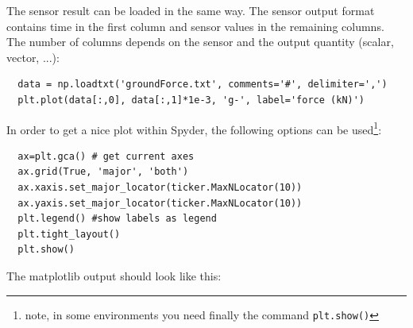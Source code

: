 The sensor result can be loaded in the same way. The sensor output format contains time in the first column and sensor values in the remaining columns. The number of columns depends on the 
sensor and the output quantity (scalar, vector, ...):
\pythonstyle\begin{lstlisting}
  data = np.loadtxt('groundForce.txt', comments='#', delimiter=',')
  plt.plot(data[:,0], data[:,1]*1e-3, 'g-', label='force (kN)')
\end{lstlisting}
%
In order to get a nice plot within Spyder, the following options can be used\footnote{note, in some environments you need finally the command \texttt{plt.show()}}:
\pythonstyle\begin{lstlisting}
  ax=plt.gca() # get current axes
  ax.grid(True, 'major', 'both')
  ax.xaxis.set_major_locator(ticker.MaxNLocator(10))
  ax.yaxis.set_major_locator(ticker.MaxNLocator(10))
  plt.legend() #show labels as legend
  plt.tight_layout()
  plt.show() 
\end{lstlisting}
%
The matplotlib output should look like this:
%



